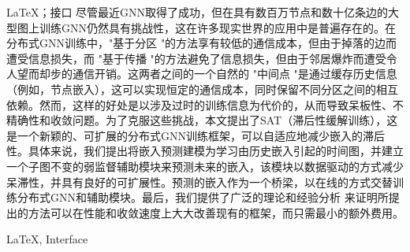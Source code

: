 \begin{中文摘要}{\LaTeX ；接口}
  尽管最近GNN取得了成功，但在具有数百万节点和数十亿条边的大型图上训练GNN仍然具有挑战性，这在许多现实世界的应用中是普遍存在的。在分布式GNN训练中，"基于分区 "的方法享有较低的通信成本，但由于掉落的边而遭受信息损失，而 "基于传播 "的方法避免了信息损失，但由于邻居爆炸而遭受令人望而却步的通信开销。这两者之间的一个自然的 "中间点 "是通过缓存历史信息（例如，节点嵌入），这可以实现恒定的通信成本，同时保留不同分区之间的相互依赖。然而，这样的好处是以涉及过时的训练信息为代价的，从而导致呆板性、不精确性和收敛问题。为了克服这些挑战，本文提出了SAT（滞后性缓解训练），这是一个新颖的、可扩展的分布式GNN训练框架，可以自适应地减少嵌入的滞后性。具体来说，我们提出将嵌入预测建模为学习由历史嵌入引起的时间图，并建立一个子图不变的弱监督辅助模块来预测未来的嵌入，该模块以数据驱动的方式减少呆滞性，并具有良好的可扩展性。预测的嵌入作为一个桥梁，以在线的方式交替训练分布式GNN和辅助模块。最后，我们提供了广泛的理论和经验分析
  来证明所提出的方法可以在性能和收敛速度上大大改善现有的框架，而只需最小的额外费用。
  
\end{中文摘要}

\begin{英文摘要}{LaTeX, Interface}
  \lipsum[1]
\end{英文摘要}
